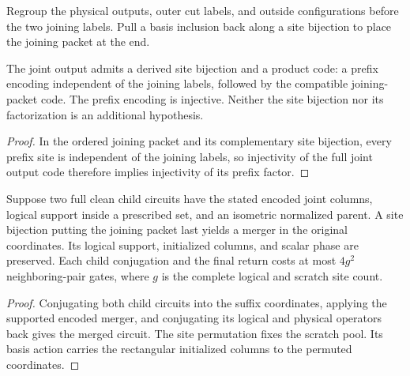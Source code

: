 \begin{definition}
    \label{def:mpu_actual_suffix_factorization}
    \leanok
    Regroup the physical outputs, outer cut labels, and outside configurations
    before the two joining labels. Pull a basis inclusion back along a site
    bijection to place the joining packet at the end.
\end{definition}

\begin{lemma}
    \label{thm:mpu_actual_suffix_factorization}
    \leanok
    The joint output admits a derived site bijection and a product code:
    a prefix encoding independent of the joining labels, followed by the compatible
    joining-packet code. The prefix encoding is injective. Neither the site
    bijection nor its factorization is an additional hypothesis.
\end{lemma}
\begin{proof}\leanok
    In the ordered joining packet and its complementary site bijection,
    every prefix site is independent of the joining labels, so injectivity of the full
    joint output code therefore implies injectivity of its prefix factor.
\end{proof}

\begin{lemma}
    \label{thm:mpu_permuted_encoded_merger}
    \leanok
    Suppose two full clean child circuits have the stated encoded joint columns,
    logical support inside a prescribed set, and an isometric normalized parent.
    A site bijection putting the joining packet last yields a merger in the original
    coordinates. Its logical support, initialized columns, and scalar phase are
    preserved. Each child conjugation and the final return costs at most $4g^2$
    neighboring-pair gates, where $g$ is the complete logical and scratch site count.
\end{lemma}
\begin{proof}\leanok
    Conjugating both child circuits into the suffix coordinates, applying the supported
    encoded merger, and conjugating its logical and physical operators back gives the merged circuit.
    The site permutation fixes the scratch pool. Its basis action carries the
    rectangular initialized columns to the permuted coordinates.
\end{proof}

